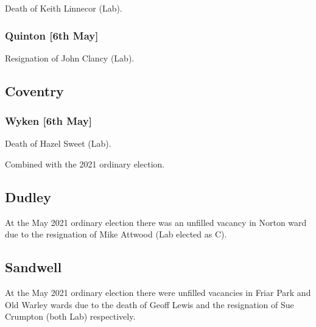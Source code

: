 \documentclass[a4paper,openany]{book}
\begin{document}
\begin{resultsiii}

Death of Keith Linnecor (Lab).

\subsubsection*{Quinton \hspace*{\fill}\nolinebreak[1]%
	\enspace\hspace*{\fill}
	[6th May]}


Resignation of John Clancy (Lab).

\subsection*{Coventry}

\subsubsection*{Wyken \hspace*{\fill}\nolinebreak[1]%
	\enspace\hspace*{\fill}
	[6th May]}


Death of Hazel Sweet (Lab).

Combined with the 2021 ordinary election.

\subsection*{Dudley}

At the May 2021 ordinary election there was an unfilled vacancy in Norton ward due to the resignation of Mike Attwood (Lab elected as C).

\subsection*{Sandwell}

At the May 2021 ordinary election there were unfilled vacancies in Friar Park and Old Warley wards due to the death of Geoff Lewis and the resignation of Sue Crumpton (both Lab) respectively.


\end{resultsiii}
\end{document}
